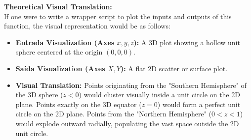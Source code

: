 \vspace{1em}
\textbf{Theoretical Visual Translation:}\\
If one were to write a wrapper script to plot the inputs and outputs of this function, the visual representation would be as follows:
\begin{itemize}
    \item \textbf{Entrada Visualization (Axes $x, y, z$):} A 3D plot showing a hollow unit sphere centered at the origin $(0,0,0)$. 
    \item \textbf{Saída Visualization (Axes $X, Y$):} A flat 2D scatter or surface plot. 
    \item \textbf{Visual Translation:} Points originating from the "Southern Hemisphere" of the 3D sphere ($z < 0$) would cluster visually inside a unit circle on the 2D plane. Points exactly on the 3D equator ($z = 0$) would form a perfect unit circle on the 2D plane. Points from the "Northern Hemisphere" ($0 < z < 1$) would explode outward radially, populating the vast space outside the 2D unit circle.
\end{itemize}

